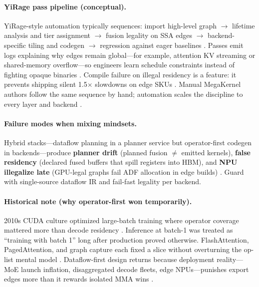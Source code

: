 \paragraph{YiRage pass pipeline (conceptual).}
YiRage-style automation typically sequences: import high-level graph $\rightarrow$ lifetime analysis and tier assignment $\rightarrow$ fusion legality on SSA edges $\rightarrow$ backend-specific tiling and codegen $\rightarrow$ regression against eager baselines \citep{yirage2026,chen2020compilerbasedhardw}.
Passes emit logs explaining why edges remain global---for example, attention KV streaming or shared-memory overflow---so engineers learn schedule constraints instead of fighting opaque binaries \citep{patel2025llminference}.
Compile failure on illegal residency is a feature: it prevents shipping silent 1.5$\times$ slowdowns on edge SKUs \citep{amd2024xdna}.
Manual MegaKernel authors follow the same sequence by hand; automation scales the discipline to every layer and backend \citep{memoryfloor2026,taxbreak2026}.

\paragraph{Failure modes when mixing mindsets.}
Hybrid stacks---dataflow planning in a planner service but operator-first codegen in backends---produce \textbf{planner drift} (planned fusion $\neq$ emitted kernels), \textbf{false residency} (declared fused buffers that spill registers into HBM), and \textbf{NPU illegalize late} (GPU-legal graphs fail ADF allocation in edge builds) \citep{yirage2026}.
Guard with single-source dataflow IR and fail-fast legality per backend.

\paragraph{Historical note (why operator-first won temporarily).}
2010s CUDA culture optimized large-batch training where operator coverage mattered more than decode residency \citep{dlbook}.
Inference at batch-1 was treated as ``training with batch 1'' long after production proved otherwise.
FlashAttention, PagedAttention, and graph capture each fixed a slice without overturning the op-list mental model \citep{dao2022flashattention,kwon2023vllm,nvidia2024cudagraphs}.
Dataflow-first design returns because deployment reality---MoE launch inflation, disaggregated decode fleets, edge NPUs---punishes export edges more than it rewards isolated MMA wins \citep{taxbreak2026,liu2024deepseekv3}.

